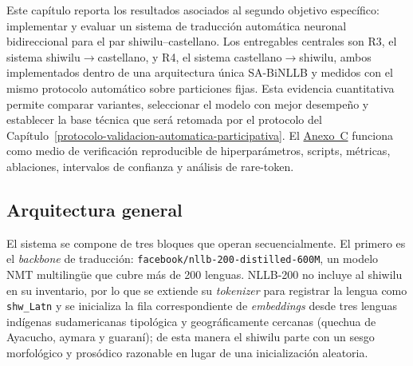\documentclass[12pt,a4paper,oneside]{book}
\begin{document}
Este capítulo reporta los resultados asociados al segundo objetivo específico: implementar y evaluar un sistema de traducción automática neuronal bidireccional para el par shiwilu--castellano. Los entregables centrales son R3, el sistema shiwilu\(\rightarrow\)castellano, y R4, el sistema castellano\(\rightarrow\)shiwilu, ambos implementados dentro de una arquitectura única SA-BiNLLB y medidos con el mismo protocolo automático sobre particiones fijas. Esta evidencia cuantitativa permite comparar variantes, seleccionar el modelo con mejor desempeño y establecer la base técnica que será retomada por el protocolo del Capítulo~\ref{protocolo-validacion-automatica-participativa}. El \hyperref[anexo-nmt-reproducible]{Anexo~C} funciona como medio de verificación reproducible de hiperparámetros, scripts, métricas, ablaciones, intervalos de confianza y análisis de rare-token.

\subsection{Arquitectura general}\label{nmt-arquitectura}

El sistema se compone de tres bloques que operan secuencialmente. El primero es el \emph{backbone} de traducción: \texttt{facebook/nllb-200-distilled-600M}, un modelo NMT multilingüe que cubre más de 200 lenguas. NLLB-200 no incluye al shiwilu en su inventario, por lo que se extiende su \emph{tokenizer} para registrar la lengua como \texttt{shw\_Latn} y se inicializa la fila correspondiente de \emph{embeddings} desde tres lenguas indígenas sudamericanas tipológica y geográficamente cercanas (quechua de Ayacucho, aymara y guaraní); de esta manera el shiwilu parte con un sesgo morfológico y prosódico razonable en lugar de una inicialización aleatoria.
\end{document}
